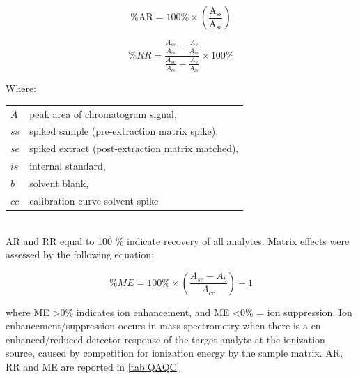 \begin{equation}
    \label{eq:Recovery}
    \mathrm{\% AR  = 100 \% \times \left ( \frac{A_{ss}}{A_{se}} \right ) }
\end{equation}

\begin{equation}
    \label{eq:relativeRecovery}
    \% RR = \frac{\frac{A_{ss}}{A_{is}}-\frac{A_{b}}{A_{is}}}{\frac{A_{se}}{A_{is}}-\frac{A_{b}}{A_{is}}}\times 100 \% 
\end{equation}

Where: \newline
\newline
\begin{tabular}{p{1cm}p{20cm}}
    $A$   & peak area of chromatogram signal, \\
    $ss$  & spiked sample (pre-extraction matrix spike), \\
    $se$  & spiked extract (post-extraction matrix matched), \\
    $is$  & internal standard, \\
    $b$   & solvent blank, \\
    $cc$  & calibration curve solvent spike \\
\end{tabular} \\

AR and RR equal to 100 \% indicate recovery of all analytes. Matrix effects were assessed by the following equation:

\begin{equation}
    \label{eq:ME}
    \% ME = 100 \% \times \left(\frac{A_{se} - A_b}{A_{cc}}\right )-1 
\end{equation}

where ME \textgreater 0\% indicates ion enhancement, and ME \textless 0\% = ion suppression. Ion enhancement/suppression occurs in mass spectrometry when there is a en enhanced/reduced detector response of the target analyte at the ionization source, caused by competition for ionization energy by the sample matrix. AR, RR and ME are reported in \cref{tab:QAQC}

